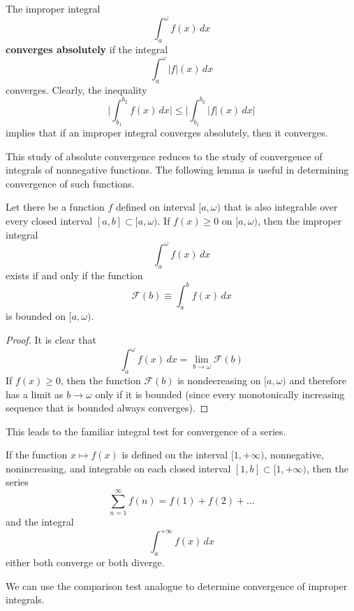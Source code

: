     \begin{definition}
      The improper integral 
      \[\int_a^\omega f(x)\,dx\]
      \textbf{converges absolutely} if the integral
      \[\int_a^\omega |f|(x)\,dx\]
      converges. Clearly, the inequality
      \[\Bigg| \int_{b_1}^{b_2} f(x)\,dx \Bigg| \leq \Bigg| \int_{b_1}^{b_2} |f|(x)\,dx \Bigg|\]
      implies that if an improper integral converges absolutely, then it converges. 
    \end{definition}

    This study of absolute convergence reduces to the study of convergence of integrals of nonnegative functions. The following lemma is useful in determining convergence of such functions. 

    \begin{lemma}
      Let there be a function $f$ defined on interval $[a, \omega)$ that is also integrable over every closed interval $[a, b] \subset [a, \omega)$. If $f(x) \geq 0$ on $[a, \omega)$, then the improper integral 
      \[\int_a^\omega f(x)\,dx\]
      exists if and only if the function 
      \[\mathcal{F}(b) \equiv \int_a^b f(x)\,dx\]
      is bounded on $[a, \omega)$. 
    \end{lemma}
    \begin{proof}
    It is clear that 
    \[\int_a^\omega f(x)\,dx = \lim_{b \rightarrow \omega} \mathcal{F}(b)\]
    If $f(x)\geq 0$, then the function $\mathcal{F}(b)$ is nondecreasing on $[a, \omega)$ and therefore has a limit as $b \rightarrow \omega$ only if it is bounded (since every monotonically increasing sequence that is bounded always converges). 
    \end{proof}

    This leads to the familiar integral test for convergence of a series. 

    \begin{theorem}
    If the function $x \mapsto f(x)$ is defined on the interval $[1, +\infty)$, nonnegative, nonincreasing, and integrable on each closed interval $[1, b] \subset [1, +\infty)$, then the series 
    \[\sum_{n=1}^\infty f(n) = f(1) + f(2) + \ldots\]
    and the integral 
    \[\int_a^{+\infty} f(x)\,dx\]
    either both converge or both diverge. 
    \end{theorem}

    We can use the comparison test analogue to determine convergence of improper integrals. 

